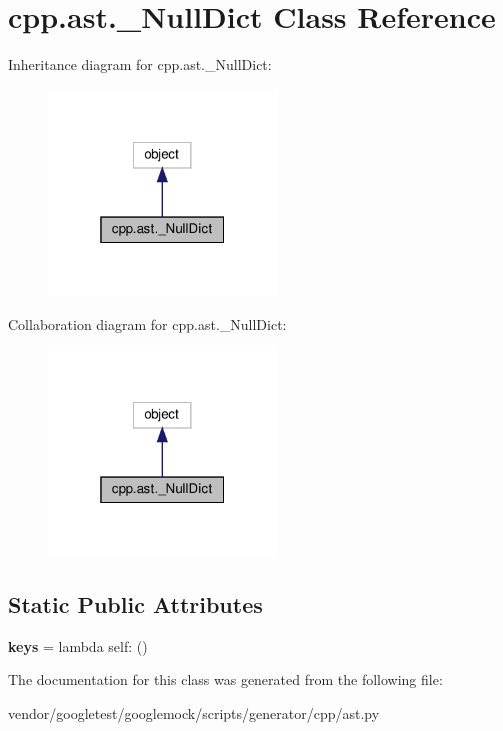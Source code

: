 \hypertarget{classcpp_1_1ast_1_1___null_dict}{}\section{cpp.\+ast.\+\_\+\+Null\+Dict Class Reference}
\label{classcpp_1_1ast_1_1___null_dict}


Inheritance diagram for cpp.\+ast.\+\_\+\+Null\+Dict\+:
\nopagebreak
\begin{figure}[H]
\begin{center}
\leavevmode
\includegraphics[width=172pt]{classcpp_1_1ast_1_1___null_dict__inherit__graph}
\end{center}
\end{figure}


Collaboration diagram for cpp.\+ast.\+\_\+\+Null\+Dict\+:
\nopagebreak
\begin{figure}[H]
\begin{center}
\leavevmode
\includegraphics[width=172pt]{classcpp_1_1ast_1_1___null_dict__coll__graph}
\end{center}
\end{figure}
\subsection*{Static Public Attributes}
\begin{DoxyCompactItemize}
\item 
\mbox{\label{classcpp_1_1ast_1_1___null_dict_abb0b7884aa59bede0a8503dffcd1733f}} 
{\bfseries keys} = lambda self\+: ()
\end{DoxyCompactItemize}


The documentation for this class was generated from the following file\+:\begin{DoxyCompactItemize}
\item 
vendor/googletest/googlemock/scripts/generator/cpp/ast.\+py\end{DoxyCompactItemize}
